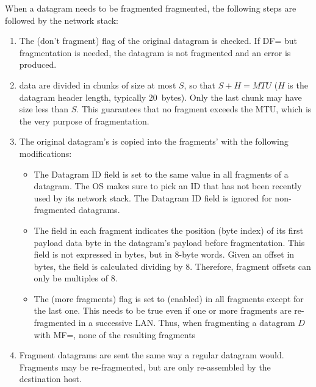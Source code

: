 When a datagram needs to be fragmented fragmented, the following steps are followed 
by the network stack:
\begin{enumerate}

\item The  (don't fragment) flag of the original datagram is checked. 
    If DF= but fragmentation is needed, the datagram is not fragmented 
    and an error is produced.\\[-0.2cm]

\item {} data are divided in chunks of size at most $S$, so that $S + H = MTU$ 
  ($H$ is the datagram header length, typically $20$~bytes). Only the last chunk
  may have size less than $S$. This guarantees that no fragment exceeds the MTU,
  which is the very purpose of fragmentation.\\[-0.2cm]
  
\item The original datagram's  is copied into the fragments' with the following modifications:
  \begin{itemize}
  \item The Datagram ID field is set to the same value in all fragments of a datagram. 
    The OS makes sure to pick an ID that has not been recently used by its network stack.
    The Datagram ID field is ignored for non-fragmented datagrams.\\[-0.3cm]
    
  \item The  field in each fragment indicates the position (byte index)
    of its first payload data byte in the datagram's payload before fragmentation.
    This field is not expressed in bytes, but in $8$-byte words.
    Given an offset in bytes, the  field is calculated dividing by $8$.
    Therefore, fragment offsets can only be multiples of $8$.\\[-0.3cm]
    
  \item The  (more fragments) flag is set to  (enabled) 
    in all fragments except for the last one. This needs to be true even if one or more
    fragments are re-fragmented in a successive LAN. Thus, when fragmenting a 
    datagram $D$ with MF=, none of the resulting fragments\\[-0.2cm]
  \end{itemize}
  
\item Fragment datagrams are sent the same way a regular datagram would.
  Fragments may be re-fragmented, but are only re-assembled by the destination host.
  
\end{enumerate}


